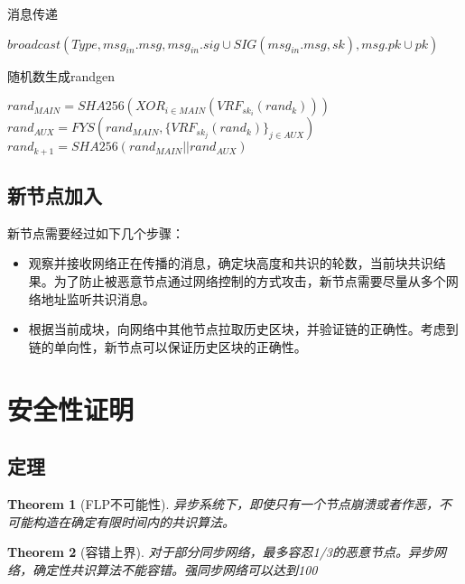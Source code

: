 \documentclass[12pt, UTF8]{article}
\newtheorem{theorem}{Theorem}[section]
\begin{document}
 \newpage

\begin{algorithm}[H]
\DontPrintSemicolon
\SetAlgoNoEnd
\SetAlgoLined
\caption{消息传递}


 $broadcast(Type, msg_{in}.msg, msg_{in}.sig \cup SIG(msg_{in}.msg, sk), msg.pk \cup pk)$\;
\end{algorithm}

\begin{algorithm}[H]
\DontPrintSemicolon
\SetAlgoNoEnd
\SetAlgoLined
\caption{随机数生成randgen}

$rand_{MAIN} = SHA256(XOR_{i\in{MAIN}} (VRF_{sk_i}(rand_k)))$\;
$rand_{AUX} = FYS(rand_{MAIN}, \{VRF_{sk_j}(rand_k)\}_{j\in{AUX}})$\;
$rand_{k+1} = SHA256(rand_{MAIN} || rand_{AUX})$\;
\end{algorithm}

\subsection{新节点加入}
新节点需要经过如下几个步骤：
\begin{itemize}
\item 观察并接收网络正在传播的消息，确定块高度和共识的轮数，当前块共识结果。为了防止被恶意节点通过网络控制的方式攻击，新节点需要尽量从多个网络地址监听共识消息。
\item 根据当前成块，向网络中其他节点拉取历史区块，并验证链的正确性。考虑到链的单向性，新节点可以保证历史区块的正确性。
\end{itemize}

\newpage
\section{安全性证明}
\subsection{定理}
\begin{theorem}[FLP不可能性]
\label{FLP}
异步系统下，即使只有一个节点崩溃或者作恶，不可能构造在确定有限时间内的共识算法。
\end{theorem}

\begin{theorem}[容错上界]
\label{BFT}
对于部分同步网络，最多容忍1/3的恶意节点。异步网络，确定性共识算法不能容错。强同步网络可以达到100\
\end{theorem}
\end{document}
